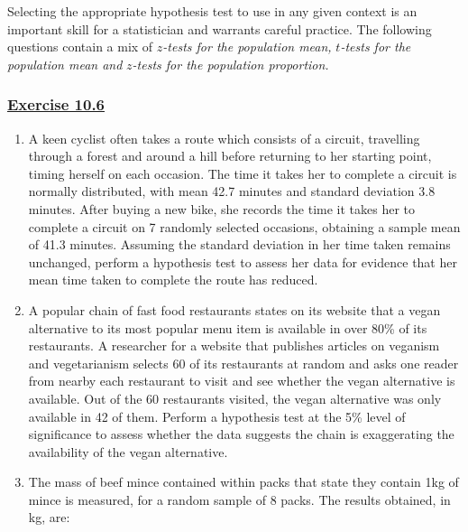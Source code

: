 \documentclass[
  11pt,
]{book}
\begin{document}
Selecting the appropriate hypothesis test to use in any given context is an important skill for a statistician and warrants careful practice. The following questions contain a mix of \(z\)\textit{-tests for the population mean, }\(t\)\textit{-tests for the population mean and }\(z\)\textit{-tests for the population proportion.}

\label{ex106q}{}

\subsubsection*{\texorpdfstring{\hyperref[ex106a]{Exercise 10.6}}{Exercise 10.6}}\label{exercise-10.6}

\begin{enumerate}
    \item A keen cyclist often takes a route which consists of a circuit, travelling through a forest and around a hill before returning to her starting point, timing herself on each occasion. The time it takes her to complete a circuit is normally distributed, with mean 42.7 minutes and standard deviation 3.8 minutes. After buying a new bike, she records the time it takes her to complete a circuit on 7 randomly selected occasions, obtaining a sample mean of 41.3 minutes. Assuming the standard deviation in her time taken remains unchanged, perform a hypothesis test to assess her data for evidence that her mean time taken to complete the route has reduced.
    \item A popular chain of fast food restaurants states on its website that a vegan alternative to its most popular menu item is available in over 80\% of its restaurants. A researcher for a website that publishes articles on veganism and vegetarianism selects 60 of its restaurants at random and asks one reader from nearby each restaurant to visit and see whether the vegan alternative is available. Out of the 60 restaurants visited, the vegan alternative was only available in 42 of them. Perform a hypothesis test at the 5\% level of significance to assess whether the data suggests the chain is exaggerating the availability of the vegan alternative.
    \item The mass of beef mince contained within packs that state they contain 1kg of mince is measured, for a random sample of 8 packs. The results obtained, in kg, are:
    \begin{center}
    \begin{tabular}{cccccccc}

\end{tabular}
\end{center}
\end{enumerate}
\end{document}
